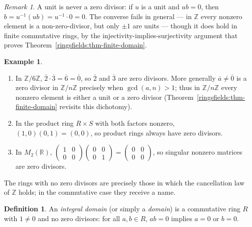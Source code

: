 \documentclass[11pt,a4paper]{article}
\theoremstyle{definition}
\newtheorem{definition}[theorem]{Definition}
\newtheorem{example}[theorem]{Example}
\theoremstyle{remark}
\newtheorem{remark}[theorem]{Remark}
\newcommand{\Z}{\ensuremath{\mathbb{Z}}}
\newcommand{\R}{\ensuremath{\mathbb{R}}}
\begin{document}
\begin{remark}\label{ringsfields:rem-unit-not-zd}
A unit is never a zero divisor: if \(u\) is a unit and \(ub=0\), then \(b = u^{-1}(ub) = u^{-1}\cdot 0 = 0\). The converse fails in general --- in \(\Z\) every nonzero element is a non-zero-divisor, but only \(\pm1\) are units --- though it does hold in finite commutative rings, by the injectivity-implies-surjectivity argument that proves Theorem~\ref{ringsfields:thm-finite-domain}.
\end{remark}

\begin{example}\label{ringsfields:exa-zerodiv}
\begin{enumerate}
\item In \(\Z/6\Z\), \(\overline 2\cdot\overline 3 = \overline 6 = \overline 0\), so \(\overline 2\) and \(\overline 3\) are zero divisors. More generally \(\overline a\neq\overline 0\) is a zero divisor in \(\Z/n\Z\) precisely when \(\gcd(a,n)>1\); thus in \(\Z/n\Z\) every nonzero element is either a unit or a zero divisor (Theorem~\ref{ringsfields:thm-finite-domain} revisits this dichotomy).
\item In the product ring \(R\times S\) with both factors nonzero, \((1,0)(0,1) = (0,0)\), so product rings always have zero divisors.
\item In \(M_2(\R)\), \(\left(\begin{smallmatrix}1&0\\0&0\end{smallmatrix}\right)\left(\begin{smallmatrix}0&0\\0&1\end{smallmatrix}\right) = \left(\begin{smallmatrix}0&0\\0&0\end{smallmatrix}\right)\), so singular nonzero matrices are zero divisors.
\end{enumerate}
\end{example}

The rings with no zero divisors are precisely those in which the cancellation law of \(\Z\) holds; in the commutative case they receive a name.

\begin{definition}\label{ringsfields:def-domain}
An \emph{integral domain} (or simply a \emph{domain}) is a commutative ring \(R\) with \(1\neq 0\) and no zero divisors: for all \(a,b\in R\), \(ab=0\) implies \(a=0\) or \(b=0\).
\end{definition}
\end{document}
